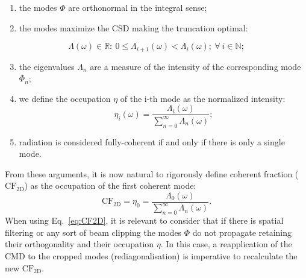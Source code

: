 \documentclass{iucr}              %
\begin{document}
\begin{enumerate}[label=(\roman*)]
\item the modes $\Phi$ are orthonormal in the integral sense;
\item the modes maximize the CSD making the truncation optimal:
\end{enumerate}
\begin{equation*}
\Lambda(\omega) \in \mathbb{R}
:~0\leq \Lambda_{i+1}(\omega)<\Lambda_i(\omega);~\forall~i \in \mathbb{N};
\end{equation*}
\begin{enumerate}[label=(\roman*)]
\setcounter{enumi}{2}
\item the eigenvalues $\Lambda_n$ are a measure of the intensity of the corresponding mode $\Phi_{n}$; 
\item we define the occupation $\eta$ of the i-th mode as the normalized intensity: 
\begin{equation}
\eta_i(\omega) =\frac{\Lambda_i(\omega)}{\sum\limits_{n=0}^\infty{\Lambda_n(\omega)}};
\end{equation}
\item radiation is considered fully-coherent if and only if there is only a single mode.
\end{enumerate}

From these arguments, it is now natural to rigorously define coherent fraction ($\text{CF}_\text{2D}$) as the occupation of the first coherent mode:
\begin{equation}
\text{CF}_\text{2D}=\eta_0=\frac{\Lambda_0(\omega)}{\sum\limits_{n=0}^\infty{\Lambda_n(\omega)}}. \label{eq:CF2D}
\end{equation}
When using Eq.~\ref{eq:CF2D}, it is relevant to consider that if there is spatial filtering or any sort of beam clipping the modes $\Phi$ do not propagate retaining their orthogonality and their occupation $\eta$. In this case, a reapplication of the CMD to the cropped modes (rediagonalisation) is imperative to recalculate the new $\text{CF}_\text{2D}$.
\end{document}
